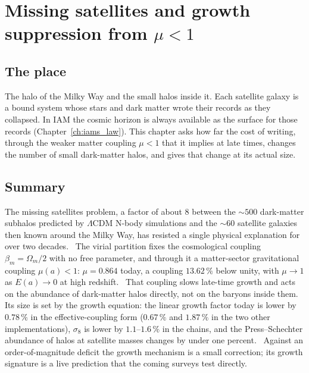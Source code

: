 \chapter{Missing satellites and growth suppression from $\mu<1$}\label{ch:satellites}

\section*{The place}
The halo of the Milky Way and the small halos inside it. Each satellite galaxy is a bound system whose stars and dark matter wrote their records as they
collapsed. In IAM the cosmic horizon is always available as the surface for those records (Chapter~\ref{ch:iams_law}). This chapter asks how far the
cost of writing, through the weaker matter coupling $\mu<1$ that it implies at late times, changes the number of small dark-matter halos, and gives
that change at its actual size.

\section*{Summary}
The missing satellites problem, a factor of about 8 between the $\sim500$ dark-matter subhalos predicted by $\Lambda$CDM N-body simulations and the
$\sim60$ satellite galaxies then known around the Milky Way, has resisted a single physical explanation for over two decades. \observed\ The virial
partition fixes the cosmological coupling $\beta_m=\Omega_m/2$ with no free parameter, and through it a matter-sector gravitational coupling $\mu(a)<1$:
$\mu=0.864$ today, a coupling $13.62\,\%$ below unity, with $\mu\to1$ as $E(a)\to0$ at high redshift. \calc\ That coupling slows late-time growth and acts
on the abundance of dark-matter halos directly, not on the baryons inside them. Its size is set by the growth equation: the linear growth factor today is
lower by $0.78\,\%$ in the effective-coupling form ($0.67\,\%$ and $1.87\,\%$ in the two other implementations), $\sigma_8$ is lower by $1.1$--$1.6\,\%$ in
the chains, and the Press--Schechter abundance of halos at satellite masses changes by under one percent. \calc\ Against an order-of-magnitude deficit
the growth mechanism is a small correction; its growth signature is a live prediction that the coming surveys test directly.

